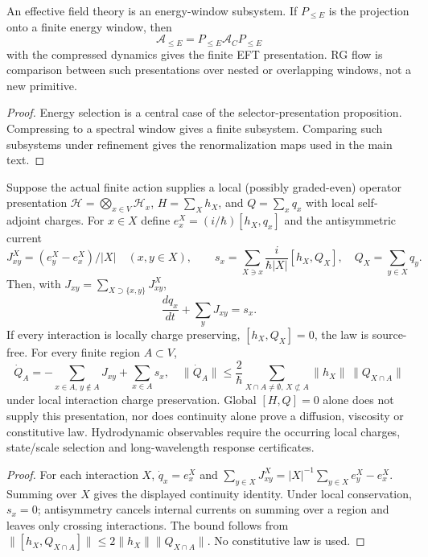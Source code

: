 \documentclass[12pt,a4paper]{article}
\begin{document}
\begin{proposition}
\label{p12:prop:eft-subsystem}
An effective field theory is an energy-window subsystem.  If \(P_{\le E}\) is the projection onto a finite energy window, then
\[
\mathcal A_{\le E}
=
P_{\le E}\mathcal A_CP_{\le E}
\]
with the compressed dynamics gives the finite EFT presentation.  RG flow is comparison between such presentations over nested or overlapping windows, not a new primitive.
\end{proposition}

\begin{proof}
Energy selection is a central case of the selector-presentation proposition.  Compressing to a spectral window gives a finite subsystem.  Comparing such subsystems under refinement gives the renormalization maps used in the main text.
\end{proof}

\begin{proposition}
\label{p12:prop:hydrodynamics-subsystem}
Suppose the actual finite action supplies a local (possibly graded-even)
operator presentation $\mathcal H=\bigotimes_{x\in V}\mathcal H_x$,
$H=\sum_Xh_X$, and $Q=\sum_xq_x$ with local self-adjoint charges.
For $x\in X$ define
$e_x^X=(i/\hbar)[h_X,q_x]$ and the antisymmetric current
\[
 J_{xy}^X=(e_y^X-e_x^X)/|X|\quad(x,y\in X),\qquad
 s_x=\sum_{X\ni x}\frac{i}{\hbar|X|}[h_X,Q_X],
 \quad Q_X=\sum_{y\in X}q_y.
\]
Then, with $J_{xy}=\sum_{X\supset\{x,y\}}J_{xy}^X$,
\[
 \boxed{\frac{dq_x}{dt}+\sum_yJ_{xy}=s_x.}
\]
If every interaction is locally charge preserving,
$[h_X,Q_X]=0$, the law is source-free. For every finite region
$A\subset V$,
\[
 \dot Q_A=-\sum_{x\in A,\,y\notin A}J_{xy}+\sum_{x\in A}s_x,
 \quad
 \|\dot Q_A\|\le\frac2\hbar
 \sum_{X\cap A\ne\emptyset,\,X\not\subset A}
 \|h_X\|\,\|Q_{X\cap A}\|
\]
under local interaction charge preservation.
Global $[H,Q]=0$ alone does not supply this presentation, nor does
continuity alone prove a diffusion, viscosity or constitutive law.
Hydrodynamic observables require the occurring local charges,
state/scale selection and long-wavelength response certificates.
\end{proposition}
\begin{proof}
For each interaction $X$, $\dot q_x=e_x^X$ and
$\sum_{y\in X}J_{xy}^X=|X|^{-1}\sum_{y\in X}e_y^X-e_x^X$.
Summing over $X$ gives the displayed continuity identity. Under local
conservation, $s_x=0$; antisymmetry cancels internal currents on summing
over a region and leaves only crossing interactions. The bound follows
from $\|[h_X,Q_{X\cap A}]\|\le2\|h_X\|\|Q_{X\cap A}\|$.
No constitutive law is used.
\end{proof}
\end{document}
